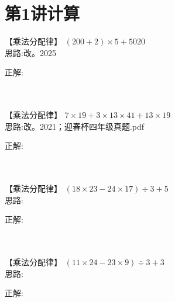 \section{第1讲\quad 计算}

\item {
    【乘法分配律】
    $(200+2)\times 5 + 5020$ 
    \ifshowSolution
        \fangsong{}
        \\
        思路:改。2025

        正解: 
    \else
        \\ \\ \\
    \fi
}



\item {
    【乘法分配律】
    $7\times 19 + 3\times 13\times 41 + 13\times 19$
    \ifshowSolution
        \fangsong{}
        \\
        思路:改。2021；迎春杯四年级真题.pdf

        正解: 
    \else
        \\ \\ \\
    \fi
}

\item {
    【乘法分配律】
    $(18\times 23 - 24\times 17)\div 3 + 5$
    \ifshowSolution
        \fangsong{}
        \\
        思路:

        正解: 
    \else
        \\ \\ \\
    \fi
}

\item {
    【乘法分配律】
    $(11\times 24 - 23\times 9)\div 3 + 3$
    \ifshowSolution
        \fangsong{}
        \\
        思路:

        正解: 
    \else
        \\ \\ \\
    \fi
}

